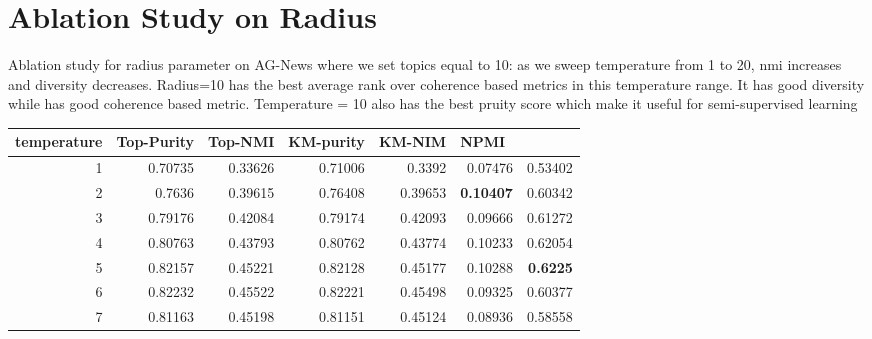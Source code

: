 \documentclass[11pt]{article}
\begin{document}
\section{Ablation Study on Radius}
\label{radius}
Ablation study for radius parameter on AG-News where we set topics equal to 10: as we sweep temperature from 1 to 20, nmi increases and diversity decreases. Radius=10 has the best average rank over coherence based metrics in this temperature range. It has good diversity while has good coherence based metric. Temperature = 10 also has the best pruity score which make it useful for semi-supervised learning 
\begin{table}
\centering

\begin{tabular}{|r|r|r|r|r|r|r|}
\multicolumn{1}{l}{temperature} & \multicolumn{1}{l}{Top-Purity} & \multicolumn{1}{l}{Top-NMI} & \multicolumn{1}{l}{KM-purity} & \multicolumn{1}{l}{KM-NIM} & \multicolumn{1}{l}{NPMI} & \multicolumn{1}{l}{}  \\ 
\hline
1                               & 0.70735                    & 0.33626                 & 0.71006                       & 0.3392                     & 0.07476                  & 0.53402                 \\ 
\hline
2                               & 0.7636                     & 0.39615                 & 0.76408                       & 0.39653                    & \textbf{0.10407}                  & 0.60342                 \\ 
\hline
3                               & 0.79176                    & 0.42084                 & 0.79174                       & 0.42093                    & 0.09666                  & 0.61272                 \\ 
\hline
4                               & 0.80763                    & 0.43793                 & 0.80762                       & 0.43774                    & 0.10233                  & 0.62054                 \\ 
\hline
5                               & 0.82157                    & 0.45221                 & 0.82128                       & 0.45177                    & 0.10288                  & \textbf{0.6225}                  \\ 
\hline
6                               & 0.82232                    & 0.45522                 & 0.82221                       & 0.45498                    & 0.09325                  & 0.60377                 \\ 
\hline
7                               & 0.81163                    & 0.45198                 & 0.81151                       & 0.45124                    & 0.08936                  & 0.58558                 \\ 

\end{tabular}
\end{table}
\end{document}
